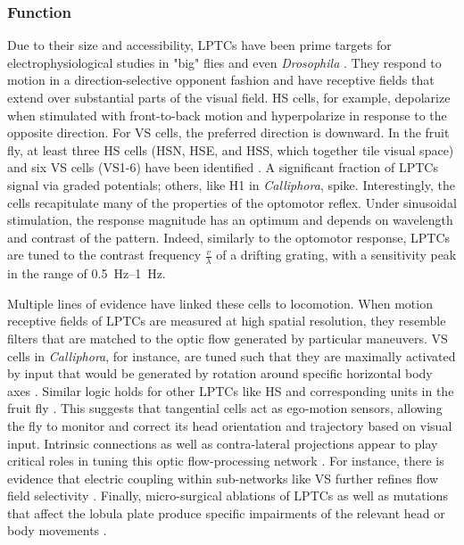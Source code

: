 \subsubsection{Function}
Due to their size and accessibility, LPTCs have been prime targets for electrophysiological studies in "big" flies \citep{Hausen:1976aa,Hausen:1982aa,Hausen:1982bb,Hengstenberg:1982aa,Borst:2010fk} and even \textit{Drosophila} \citep{Joesch:2008fo,Schnell:2010uz}. They respond to motion in a direction-selective opponent fashion and have receptive fields that extend over substantial parts of the visual field. HS cells, for example, depolarize when stimulated with front-to-back motion and hyperpolarize in response to the opposite direction. For VS cells, the preferred direction is downward. In the fruit fly, at least three HS cells (HSN, HSE, and HSS, which together tile visual space) and six VS cells (VS1-6) have been identified \citep{Joesch:2008fo,Schnell:2010uz}. A significant fraction of LPTCs signal via graded potentials; others, like H1 in \textit{Calliphora}, spike. Interestingly, the cells recapitulate many of the properties of the optomotor reflex. Under sinusoidal stimulation, the response magnitude has an optimum and depends on wavelength and contrast of the pattern. Indeed, similarly to the optomotor response, LPTCs are tuned to the contrast frequency $\frac{v}{\lambda}$ of a drifting grating, with a sensitivity peak in the range of \SIrange{0.5}{1}{\hertz}.

Multiple lines of evidence have linked these cells to locomotion. When motion receptive fields of LPTCs are measured at high spatial resolution, they resemble filters that are matched to the optic flow generated by particular maneuvers. VS cells in \textit{Calliphora}, for instance, are tuned such that they are maximally activated by input that would be generated by rotation around specific horizontal body axes \citep{Krapp:1996}. Similar logic holds for other LPTCs like HS and corresponding units in the fruit fly \citep{Krapp:1998aa,Schnell:2010ik}. This suggests that tangential cells act as ego-motion sensors, allowing the fly to monitor and correct its head orientation and trajectory based on visual input. Intrinsic connections as well as contra-lateral projections appear to play critical roles in tuning this optic flow-processing network \cite{Borst:2011kk,Weber:2012dr}. For instance, there is evidence that electric coupling within sub-networks like VS further refines flow field selectivity \cite{Haag:2004ho}. Finally, micro-surgical ablations of LPTCs as well as mutations that affect the lobula plate produce specific impairments of the relevant head or body movements \citep{Heisenberg:1978aa,Geiger:1981aa,Hausen:1983js}.

